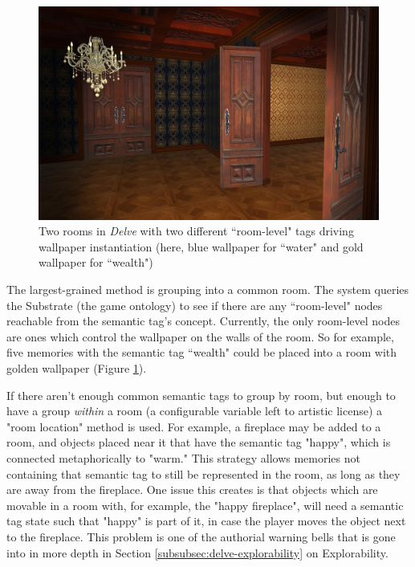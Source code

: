 \begin{figure}
    \centering
    \includegraphics[width=\textwidth]{figures/4-Delve/room.jpg}
    \caption{Two rooms in \textit{Delve} with two different ``room-level" tags driving wallpaper instantiation (here, blue wallpaper for ``water" and gold wallpaper for ``wealth")}
    \label{fig:delve-room}
\end{figure}


The largest-grained method is grouping into a common room. The system queries the Substrate (the game ontology) to see if there are any ``room-level" nodes reachable from the semantic tag's concept. Currently, the only room-level nodes are ones which control the wallpaper on the walls of the room. So for example, five memories with the semantic tag ``wealth" could be placed into a room with golden wallpaper (Figure \ref{fig:delve-room}).

If there aren't enough common semantic tags to group by room, but enough to have a group \textit{within} a room (a configurable variable left to artistic license) a "room location" method is used. For example, a fireplace may be added to a room, and objects placed near it that have the semantic tag "happy", which is connected metaphorically to "warm." This strategy allows memories not containing that semantic tag to still be represented in the room, as long as they are away from the fireplace. One issue this creates is that objects which are movable in a room with, for example, the "happy fireplace", will need a semantic tag state such that "happy" is part of it, in case the player moves the object next to the fireplace. This problem is one of the authorial warning bells that is gone into in more depth in Section \ref{subsubsec:delve-explorability} on Explorability.

